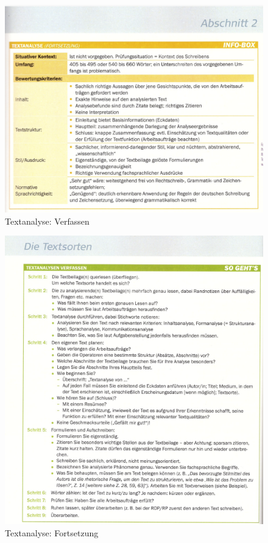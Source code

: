 \begin{figure}[h][p]
    \centering
    \includegraphics[scale=0.8]{pics/Screenshot from 2023-02-06 12-30-55.png}
    \caption{Textanalyse: Verfassen}
    \label{fig:impl:Textanalyse2}
\end{figure}
\begin{figure}[h][p]
    \centering
    \includegraphics[scale=0.8]{pics/Screenshot from 2023-02-06 12-31-09.png}
    \caption{Textanalyse: Fortsetzung}
    \label{fig:impl:Textanalyse3}
\end{figure}
